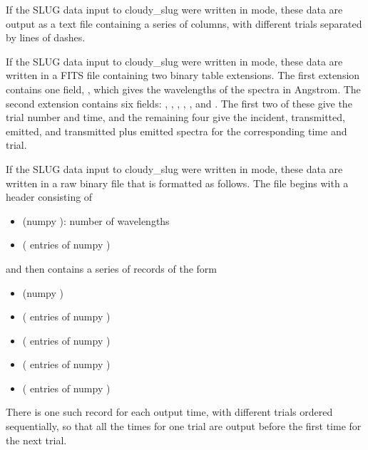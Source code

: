 \documentclass[letterpaper,10pt,english]{sphinxmanual}
\begin{document}
If the SLUG data input to cloudy\_slug were written in  mode,
these data are output as a text file containing a series of columns,
with different trials separated by lines of dashes.

If the SLUG data input to cloudy\_slug were written in  mode,
these data are written in a FITS file containing two binary table
extensions. The first extension contains one field, ,
which gives the wavelengths of the spectra in Angstrom. The second
extension contains six fields: , ,
, , ,
and . The first two of these give
the trial number and time, and the remaining four give the incident,
transmitted, emitted, and transmitted plus emitted spectra for the
corresponding time and trial.

If the SLUG data input to cloudy\_slug were written in  mode,
these data are written in a raw binary file that is formatted as
follows. The file begins with a header consisting of
\begin{itemize}
\item {} 
 (numpy ): number of wavelengths

\item {} 
 ( entries of numpy )

\end{itemize}

and then contains a series of records of the form
\begin{itemize}
\item {} 
 (numpy )

\item {} 
 ( entries of numpy )

\item {} 
 ( entries of numpy )

\item {} 
 ( entries of numpy )

\item {} 
 ( entries of numpy
)

\end{itemize}

There is one such record for each output time, with different trials ordered sequentially, so that all the times for one trial are output before the first time for the next trial.
\end{document}
